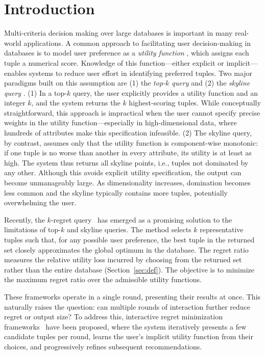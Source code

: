 \section{Introduction}
\label{sec:intro}

Multi-criteria decision making over large databases is important in many real-world applications.
A common approach to facilitating user decision-making in databases is to model user preference as a \textit{utility function} \cite{CB00, NL12, NS10}, which assigns each tuple a numerical score. Knowledge of this function—either explicit or implicit—enables systems to reduce user effort in identifying preferred tuples. Two major paradigms built on this assumption are (1) the \emph{top-$k$ query} \cite{GY05, PL07, SI07, LYH09, LC09} and (2) the \emph{skyline query} \cite{CJ06, CJ062, LY07, MC09, PT05}.
(1) In a top-$k$ query, the user explicitly provides a utility function and an integer $k$, and the system returns the $k$ highest-scoring tuples. While conceptually straightforward, this approach is impractical when the user cannot specify precise weights in the utility function—especially in high-dimensional data, where hundreds of attributes make this specification infeasible.
(2) The skyline query, by contrast, assumes only that the utility function is component-wise monotonic: if one tuple is no worse than another in every attribute, its utility is at least as high. The system thus returns all skyline points, i.e., tuples not dominated by any other. Although this avoids explicit utility specification, the output can become unmanageably large. As dimensionality increases, domination becomes less common and the skyline typically contains more tuples, potentially overwhelming the user.

Recently, the $k$-regret query~\cite{AK17, asudeh2017efficient, NS10, PW14, XW18} has emerged as a promising solution to the limitations of top-$k$ and skyline queries. The method selects $k$ representative tuples such that, for any possible user preference, the best tuple in the returned set closely approximates the global optimum in the database. The regret ratio measures the relative utility loss incurred by choosing from the returned set rather than the entire database (Section~\ref{sec:def}). The objective is to minimize the maximum regret ratio over the admissible utility functions.

These frameworks operate in a single round, presenting their results at once. This naturally raises the question: can multiple rounds of interaction further reduce regret or output size? To address this, interactive regret minimization frameworks~\cite{NL12, XCL19} have been proposed, where the system iteratively presents a few candidate tuples per round, learns the user’s implicit utility function from their choices, and progressively refines subsequent recommendations.

